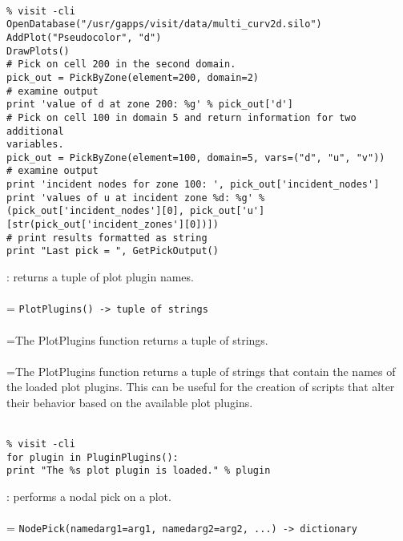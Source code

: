 \documentclass[10pt,a4paper]{report}
\begin{document}
\\[-6mm]
\begin{verbatim}% visit -cli
OpenDatabase("/usr/gapps/visit/data/multi_curv2d.silo")
AddPlot("Pseudocolor", "d")
DrawPlots()
# Pick on cell 200 in the second domain.
pick_out = PickByZone(element=200, domain=2)
# examine output
print 'value of d at zone 200: %g' % pick_out['d']
# Pick on cell 100 in domain 5 and return information for two additional
variables.
pick_out = PickByZone(element=100, domain=5, vars=("d", "u", "v"))
# examine output
print 'incident nodes for zone 100: ', pick_out['incident_nodes']
print 'values of u at incident zone %d: %g' % (pick_out['incident_nodes'][0], pick_out['u'][str(pick_out['incident_zones'][0])])
# print results formatted as string
print "Last pick = ", GetPickOutput()
\end{verbatim}
\newpage


{}
: returns a tuple of plot plugin names.\\[-3mm]

 \\ 
\hangindent=\parindent 
\verb!PlotPlugins() -> tuple of strings!\\ [-3mm]

 \\ 
\hangindent=\parindent The PlotPlugins function returns a tuple of strings. \\[-3mm] 

 \\ 
\hangindent=\parindent The PlotPlugins function returns a tuple of strings that contain the names of the loaded plot plugins. This can be useful for the creation of scripts that alter their behavior based on the available plot plugins. \\[-3mm] 

\\[-6mm]
\begin{verbatim}% visit -cli
for plugin in PluginPlugins():
print "The %s plot plugin is loaded." % plugin
\end{verbatim}
\newpage


{}
: performs a nodal pick on a plot.\\[-3mm]

 \\ 
\hangindent=\parindent 
\verb!NodePick(namedarg1=arg1, namedarg2=arg2, ...) -> dictionary!\\ [-3mm]
\end{document}
